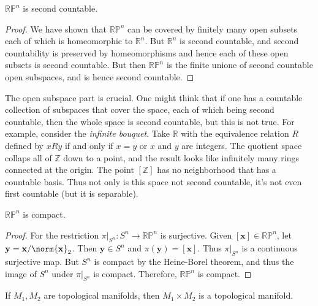 \documentclass{article}                                                        %
\begin{document}
        \begin{theorem}
            $\mathbb{RP}^{n}$ is second countable.
        \end{theorem}
        \begin{proof}
            We have shown that $\mathbb{RP}^{n}$ can be covered by finitely many
            open subsets each of which is homeomorphic to $\mathbb{R}^{n}$.
            But $\mathbb{R}^{n}$ is second countable, and second countability is
            preserved by homeomorphisms and hence each of these open subsets is
            second countable. But then $\mathbb{RP}^{n}$ is the finite unione of
            second countable open subspaces, and is hence second countable.
        \end{proof}
        The open subspace part is crucial. One might think that if one has a
        countable collection of subspaces that cover the space, each of which
        being second countable, then the whole space is second countable, but
        this is not true. For example, consider the \textit{infinite bouquet}.
        Take $\mathbb{R}$ with the equivalence relation $R$ defined by
        $xRy$ if and only if $x=y$ or $x$ and $y$ are integers. The quotient
        space collaps all of $\mathbb{Z}$ down to a point, and the result looks
        like infinitely many rings connected at the origin. The point
        $[\mathbb{Z}]$ has no neighborhood that has a countable basis. Thus not
        only is this space not second countable, it's not even first countable
        (but it is separable).
        \begin{theorem}
            $\mathbb{RP}^{n}$ is compact.
        \end{theorem}
        \begin{proof}
            For the restriction $\pi|_{S^{n}}:S^{n}\rightarrow\mathbb{RP}^{n}$
            is surjective. Given $[\mathbf{x}]\in\mathbb{RP}^{n}$, let
            $\mathbf{y}=\mathbf{x}/\norm{\mathbf{x}}_{2}$. Then
            $\mathbf{y}\in{S}^{n}$ and $\pi(\mathbf{y})=[\mathbf{x}]$. Thus
            $\pi|_{S^{n}}$ is a continuous surjective map. But $S^{n}$ is
            compact by the Heine-Borel theorem, and thus the image of
            $S^{n}$ under $\pi|_{S^{n}}$ is compact. Therefore,
            $\mathbb{RP}^{n}$ is compact.
        \end{proof}
        \begin{theorem}
            If $M_{1},M_{2}$ are topological manifolds, then
            $M_{1}\times{M}_{2}$ is a topological manifold.
        \end{theorem}
\end{document}
